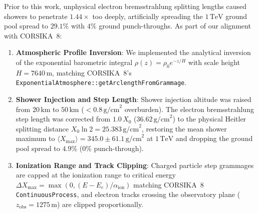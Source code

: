 \documentclass[11pt,a4paper]{article}
\begin{document}
Prior to this work, unphysical electron bremsstrahlung splitting lengths caused showers to penetrate $1.44\times$ too deeply, artificially spreading the $1\,\text{TeV}$ ground pool spread to $29.1\%$ with $4\%$ ground punch-throughs. As part of our alignment with CORSIKA~8:
\begin{enumerate}
    \item \textbf{Atmospheric Profile Inversion}: We implemented the analytical inversion of the exponential barometric integral $\rho(z) = \rho_0 e^{-z/H}$ with scale height $H = 7640\,\text{m}$, matching CORSIKA~8's \texttt{ExponentialAtmosphere::getArclengthFromGrammage}.
    \item \textbf{Shower Injection and Step Length}: Shower injection altitude was raised from $20\,\text{km}$ to $50\,\text{km}$ ($<0.8\,\text{g/cm}^2$ overburden). The electron bremsstrahlung step length was corrected from $1.0\,X_0$ ($36.62\,\text{g/cm}^2$) to the physical Heitler splitting distance $X_0 \ln 2 = 25.383\,\text{g/cm}^2$, restoring the mean shower maximum to $\langle X_\text{max} \rangle = 345.0 \pm 61.1\,\text{g/cm}^2$ at $1\,\text{TeV}$ and dropping the ground pool spread to $4.9\%$ ($0\%$ punch-through).
    \item \textbf{Ionization Range and Track Clipping}: Charged particle step grammages are capped at the ionization range to critical energy $\Delta X_\text{max} = \max(0, (E - E_c)/\alpha_\text{ion})$ matching CORSIKA~8 \texttt{ContinuousProcess}, and electron tracks crossing the observatory plane ($z_\text{obs} = 1275\,\text{m}$) are clipped proportionally.
\end{enumerate}
\end{document}
